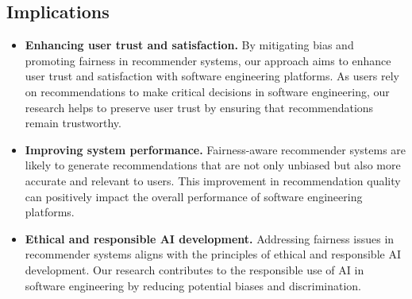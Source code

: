 \subsection{Implications}






\begin{itemize}
	\item \textbf{Enhancing user trust and satisfaction.} By mitigating bias and promoting fairness in recommender systems, our approach aims to enhance user trust and satisfaction with software engineering platforms. %
	As users rely on recommendations to make critical decisions in software engineering, our research helps to preserve user trust by ensuring that recommendations remain trustworthy.

	\item \textbf{Improving system performance.} Fairness-aware recommender systems are likely to generate recommendations that are not only unbiased but also more accurate and relevant to users. This improvement in recommendation quality can positively impact the overall performance of software engineering platforms. %

	\item \textbf{Ethical and responsible AI development.} Addressing fairness issues in recommender systems aligns with the principles of ethical and responsible AI development. Our research contributes to the responsible use of AI in software engineering by reducing potential biases and discrimination. %
 

\end{itemize}
